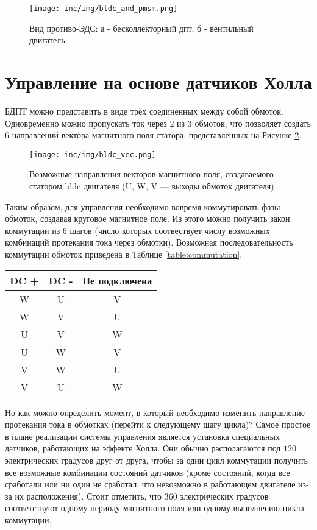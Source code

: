 \begin{figure}[!h]
\centering
\texttt{[image: inc/img/bldc\_and\_pmsm.png]}
\caption{Вид противо-ЭДС: а - бесколлекторный дпт, б - вентильный двигатель \cite{book.kim_motors}}
\label{img:eds}
\end{figure}

\section{Управление на основе датчиков Холла}
\label{sec:hall}
БДПТ можно представить в виде трёх соединенных между собой обмоток. Одновременно можно пропускать ток через 2 из 3 обмоток, что позволяет создать 6 направлений вектора магнитного поля статора, представленных на Рисунке \ref{img:mag_field}.

\begin{figure}[!h]
\centering
\texttt{[image: inc/img/bldc\_vec.png]}
\caption{Возможные направления векторов магнитного поля, создаваемого статором bldc двигателя (U, W, V --- выходы обмоток двигателя) \cite{habr:bldc_control}}
\label{img:mag_field}
\end{figure}

Таким образом, для управления необходимо вовремя коммутировать фазы обмоток, создавая круговое магнитное поле. Из этого можно получить закон коммутации из 6 шагов (число которых соотвествует числу возможных комбинаций протекания тока через обмотки). Возможная последовательность коммутации обмоток приведена в Таблице \ref{table:commutation}.

\clearpage
\begin{center}
\begin{tabular}{|c|c|c|}
 \hline
 DC + & DC - & Не подключена \\
 \hline
 W & U & V \\ 
 \hline
 W & V & U \\
 \hline
 U & V & W \\
 \hline
 U & W & V \\
 \hline
 V & W & U \\
 \hline
 V & U & W \\
 \hline
\end{tabular}
\end{center}

Но как можно определить момент, в который необходимо изменить направление протекания тока в обмотках (перейти к следующему шагу цикла)? Самое простое в плане реализации системы управления является установка специальных датчиков, работающих на эффекте Холла. Они обычно располагаются под $120$ электрических градусов друг от друга, чтобы за один цикл коммутации получить все возможные комбинации состояний датчиков (кроме состояний, когда все сработали или ни один не сработал, что невозможно в работающем двигателе из-за их расположения). Стоит отметить, что $360$ электрических градусов соответствуют одному периоду магнитного поля или одному выполнению цикла коммутации.

